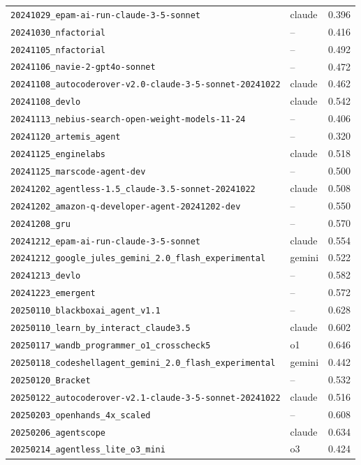 \documentclass{article}
\begin{document}
\begin{center}
\begin{longtable}{llc}
\texttt{20241029\_epam-ai-run-claude-3-5-sonnet} & claude & 0.396 \\
\texttt{20241030\_nfactorial} & -- & 0.416 \\
\texttt{20241105\_nfactorial} & -- & 0.492 \\
\texttt{20241106\_navie-2-gpt4o-sonnet} & -- & 0.472 \\
\texttt{20241108\_autocoderover-v2.0-claude-3-5-sonnet-20241022} & claude & 0.462 \\
\texttt{20241108\_devlo} & claude & 0.542 \\
\texttt{20241113\_nebius-search-open-weight-models-11-24} & -- & 0.406 \\
\texttt{20241120\_artemis\_agent} & -- & 0.320 \\
\texttt{20241125\_enginelabs} & claude & 0.518 \\
\texttt{20241125\_marscode-agent-dev} & -- & 0.500 \\
\texttt{20241202\_agentless-1.5\_claude-3.5-sonnet-20241022} & claude & 0.508 \\
\texttt{20241202\_amazon-q-developer-agent-20241202-dev} & -- & 0.550 \\
\texttt{20241208\_gru} & -- & 0.570 \\
\texttt{20241212\_epam-ai-run-claude-3-5-sonnet} & claude & 0.554 \\
\texttt{20241212\_google\_jules\_gemini\_2.0\_flash\_experimental} & gemini & 0.522 \\
\texttt{20241213\_devlo} & -- & 0.582 \\
\texttt{20241223\_emergent} & -- & 0.572 \\
\texttt{20250110\_blackboxai\_agent\_v1.1} & -- & 0.628 \\
\texttt{20250110\_learn\_by\_interact\_claude3.5} & claude & 0.602 \\
\texttt{20250117\_wandb\_programmer\_o1\_crosscheck5} & o1 & 0.646 \\
\texttt{20250118\_codeshellagent\_gemini\_2.0\_flash\_experimental} & gemini & 0.442 \\
\texttt{20250120\_Bracket} & -- & 0.532 \\
\texttt{20250122\_autocoderover-v2.1-claude-3-5-sonnet-20241022} & claude & 0.516 \\
\texttt{20250203\_openhands\_4x\_scaled} & -- & 0.608 \\
\texttt{20250206\_agentscope} & claude & 0.634 \\
\texttt{20250214\_agentless\_lite\_o3\_mini} & o3 & 0.424 \\

\end{longtable}
\end{center}
\end{document}
